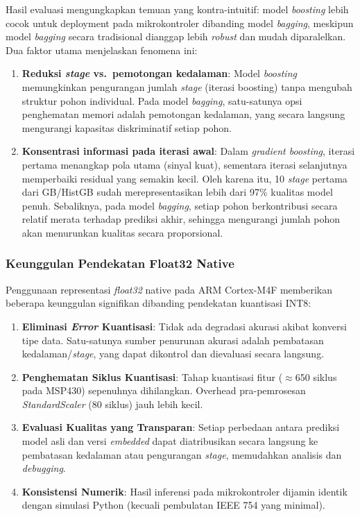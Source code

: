 Hasil evaluasi mengungkapkan temuan yang kontra-intuitif: model \textit{boosting} lebih cocok untuk deployment pada mikrokontroler dibanding model \textit{bagging}, meskipun model \textit{bagging} secara tradisional dianggap lebih \textit{robust} dan mudah diparalelkan. Dua faktor utama menjelaskan fenomena ini:

\begin{enumerate}
    \item \textbf{Reduksi \textit{stage} vs.\ pemotongan kedalaman}: Model \textit{boosting} memungkinkan pengurangan jumlah \textit{stage} (iterasi boosting) tanpa mengubah struktur pohon individual. Pada model \textit{bagging}, satu-satunya opsi penghematan memori adalah pemotongan kedalaman, yang secara langsung mengurangi kapasitas diskriminatif setiap pohon.

    \item \textbf{Konsentrasi informasi pada iterasi awal}: Dalam \textit{gradient boosting}, iterasi pertama menangkap pola utama (sinyal kuat), sementara iterasi selanjutnya memperbaiki residual yang semakin kecil. Oleh karena itu, 10 \textit{stage} pertama dari GB/HistGB sudah merepresentasikan lebih dari 97\% kualitas model penuh. Sebaliknya, pada model \textit{bagging}, setiap pohon berkontribusi secara relatif merata terhadap prediksi akhir, sehingga mengurangi jumlah pohon akan menurunkan kualitas secara proporsional.
\end{enumerate}

\subsubsection{Keunggulan Pendekatan Float32 Native}

Penggunaan representasi \textit{float32} native pada ARM Cortex-M4F memberikan beberapa keunggulan signifikan dibanding pendekatan kuantisasi INT8:

\begin{enumerate}
    \item \textbf{Eliminasi \textit{Error} Kuantisasi}: Tidak ada degradasi akurasi akibat konversi tipe data. Satu-satunya sumber penurunan akurasi adalah pembatasan kedalaman/\textit{stage}, yang dapat dikontrol dan dievaluasi secara langsung.

    \item \textbf{Penghematan Siklus Kuantisasi}: Tahap kuantisasi fitur ($\approx$650 siklus pada MSP430) sepenuhnya dihilangkan. Overhead pra-pemrosesan \textit{StandardScaler} (80 siklus) jauh lebih kecil.

    \item \textbf{Evaluasi Kualitas yang Transparan}: Setiap perbedaan antara prediksi model asli dan versi \textit{embedded} dapat diatribusikan secara langsung ke pembatasan kedalaman atau pengurangan \textit{stage}, memudahkan analisis dan \textit{debugging}.

    \item \textbf{Konsistensi Numerik}: Hasil inferensi pada mikrokontroler dijamin identik dengan simulasi Python (kecuali pembulatan IEEE 754 yang minimal).
\end{enumerate}

